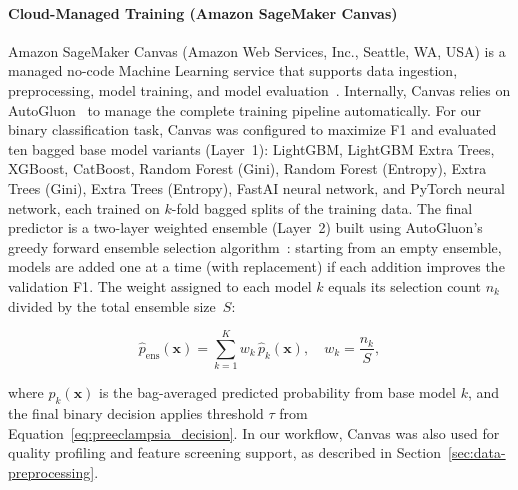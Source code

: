 \documentclass[diagnostics,article,accept,pdftex,moreauthors]{Definitions/mdpi}
\begin{document}
\paragraph{{Cloud-Managed Training (Amazon SageMaker Canvas)}}  %
Amazon SageMaker Canvas (Amazon Web Services, Inc., Seattle, WA, USA)
is a managed no-code Machine Learning service that supports data
ingestion, preprocessing, model training, and model
evaluation~\cite{aws_sagemaker_canvas_docs}.  Internally, Canvas
relies on AutoGluon~\cite{agtabular2020} to manage the complete
training pipeline automatically. For our binary classification task,
Canvas was configured to maximize \ac{F1} and evaluated ten bagged
base model variants (Layer~1): LightGBM, LightGBM Extra Trees,
XGBoost, CatBoost, Random Forest (Gini), Random Forest (Entropy),
Extra Trees (Gini), Extra Trees (Entropy), FastAI neural network, and
{PyTorch} %
  neural network, each trained on $k$-fold bagged splits of the
  training data. The final predictor is a two-layer weighted ensemble
  (Layer~2) built using AutoGluon's greedy forward ensemble selection
  algorithm~\cite{caruana2004ensemble}: starting from an empty
  ensemble, models are added one at a time (with replacement) if each
  addition improves the validation \ac{F1}. The weight assigned to
  each model $k$ equals its selection count $n_k$ divided by the total
  ensemble size~$S$:
\begin{linenomath}
\begin{equation}
  \hat{p}_{\mathrm{ens}}(\mathbf{x}) = \sum_{k=1}^{K} w_k\,\hat{p}_k(\mathbf{x}),
  \quad w_k = \frac{n_k}{S},
  \label{eq:ensemble-prediction}
\end{equation}
\end{linenomath}
where $\hat{p}_k(\mathbf{x})$ is the bag-averaged predicted
  probability from base model $k$, and the final binary decision applies
  threshold $\tau$ from Equation~\eqref{eq:preeclampsia_decision}.  In our
workflow, Canvas was also used for quality profiling and feature
screening support, as described in
Section~\ref{sec:data-preprocessing}.
\end{document}
